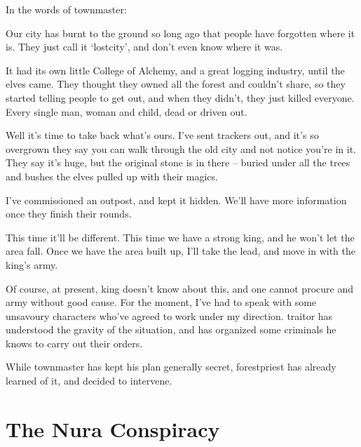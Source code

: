 \begin{multicols}{2}

In the words of \gls{townmaster}:

\begin{exampletext}

	Our city has burnt to the ground so long ago that people have forgotten where it is.
	They just call it `\gls{lostcity}', and don't even know where it was.

	It had its own little College of Alchemy, and a great logging industry, until the elves came.  They thought they owned all the forest and couldn't share, so they started telling people to get out, and when they didn't, they just killed everyone.  Every single man, woman and child, dead or driven out.

	Well it's time to take back what's ours.
	I've sent trackers out, and it's so overgrown they say you can walk through the old city and not notice you're in it.
	They say it's huge, but the original stone is in there -- buried under all the trees and bushes the elves pulled up with their magics.

	I've commissioned an outpost, and kept it hidden.
	We'll have more information once they finish their rounds.

	This time it'll be different.
	This time we have a strong king, and he won't let the area fall.
	Once we have the area built up, I'll take the lead, and move in with the king's army.

	Of course, at present, \gls{king} doesn't know about this, and one cannot procure and army without good cause.
	For the moment, I've had to speak with some unsavoury characters who've agreed to work under my direction.
	\Gls{traitor} has understood the gravity of the situation, and has organized some criminals he knows to carry out their orders.

\end{exampletext}

While \gls{townmaster} has kept his plan generally secret, \gls{forestpriest} has already learned of it, and decided to intervene.

\end{multicols}

\section{The Nura Conspiracy}

